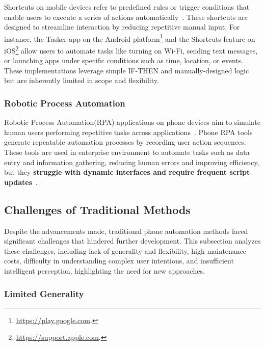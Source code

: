 Shortcuts on mobile devices refer to predefined rules or trigger conditions that enable users to execute a series of actions automatically~\cite{bridle2006inducing,guerreiro2008mnemonical,kennedy2011use}. These shortcuts are designed to streamline interaction by reducing repetitive manual input. For instance, the Tasker app on the Android platform\footnote{\href{https://play.google.com}{https://play.google.com}.} and the Shortcuts feature on iOS\footnote{\href{https://support.apple.com}{https://support.apple.com}.} allow users to automate tasks like turning on Wi-Fi, sending text messages, or launching apps under specific conditions such as time, location, or events. These implementations leverage simple IF-THEN and manually-designed logic but are inherently limited in scope and flexibility. 


\subsubsection{Robotic Process Automation}

Robotic Process Automation(RPA) applications on phone devices aim to simulate human users performing repetitive tasks across applications~\cite{agostinelli2019research}. Phone RPA tools generate repeatable automation processes by recording user action sequences. These tools are used in enterprise environment to automate tasks such as data entry and information gathering, reducing human errors and improving efficiency, but they \textbf{struggle with dynamic interfaces and require frequent script updates}~\cite{pramod2022robotic,syed2020robotic}.

\subsection{Challenges of Traditional Methods}
\label{sebsec:challenges}

Despite the advancements made, traditional phone automation methods faced significant challenges that hindered further development. This subsection analyzes these challenges, including lack of generality and flexibility, high maintenance costs, difficulty in understanding complex user intentions, and insufficient intelligent perception, highlighting the need for new approaches.

\subsubsection{Limited Generality}

